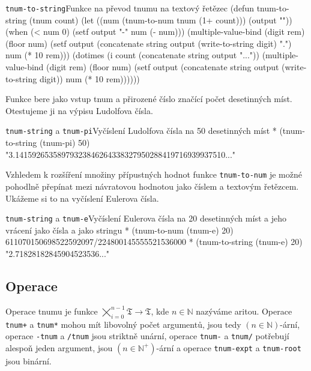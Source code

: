 \begin{lispcode}{\texttt{tnum-to-string}}{Funkce na převod tnumu na textový řetězec}
(\textcolor{funkcionalni}{defun} \textcolor{pojmenovan}{tnum-to-string} (tnum count)
  (\textcolor{vedlejsi}{let} ((num (\textcolor{moje}{tnum-to-num} tnum (\textcolor{matematicke}{1+} count))) (output ""))
    (\textcolor{funkcionalni}{when} (\textcolor{matematicke}{<} num 0) (\textcolor{vedlejsi}{setf} output "-" num (\textcolor{matematicke}{-} num)))
    (\textcolor{matematicke}{multiple-value-bind} (digit rem)
        (\textcolor{matematicke}{floor} num)
      (\textcolor{vedlejsi}{setf} output (\textcolor{matematicke}{concatenate} \textquotesingle\textcolor{moje}{string} output 
                                (\textcolor{funkcionalni}{write-to-string} digit) ".")
            num (\textcolor{matematicke}{*} 10 rem)))
    (\textcolor{funkcionalni}{dotimes} (i count (\textcolor{matematicke}{concatenate} \textquotesingle\textcolor{moje}{string} output "..."))
      (\textcolor{matematicke}{multiple-value-bind} (digit rem)
          (\textcolor{matematicke}{floor} num)
        (\textcolor{vedlejsi}{setf} output (\textcolor{matematicke}{concatenate} \textquotesingle\textcolor{moje}{string} output 
                                  (\textcolor{funkcionalni}{write-to-string} digit))
              num (\textcolor{matematicke}{*} 10 rem))))))
\end{lispcode}
Funkce bere jako vstup tnum a přirozené číslo značící počet desetinných míst. Otestujeme ji na výpisu Ludolfova čísla.

\begin{lisptest}{\texttt{tnum-string} a \texttt{tnum-pi}}{Vyčíslení Ludolfova čísla na 50 desetinných míst}
* (tnum-to-string (tnum-pi) 50)
"3.14159265358979323846264338327950288419716939937510..."
\end{lisptest}

Vzhledem k rozšíření množiny přípustných hodnot funkce \texttt{tnum-to-num} je možné pohodlně přepínat mezi návratovou hodnotou jako číslem a textovým řetězcem. Ukážeme si to na vyčíslení Eulerova čísla.

\begin{lisptest}{\texttt{tnum-string} a \texttt{tnum-e}}{Vyčíslení Eulerova čísla na 20 desetinných míst a jeho vrácení jako čísla a jako stringu}
* (tnum-to-num (tnum-e) 20)
611070150698522592097/224800145555521536000
* (tnum-to-string (tnum-e) 20)
"2.71828182845904523536..."
\end{lisptest}

\subsection{Operace}
Operace tnumu je funkce $\bigtimes_{i=0}^{n-1}\mathfrak{T}\rightarrow\mathfrak{T}$, kde $n\in\mathbb{N}$ nazýváme aritou. Operace \texttt{tnum+} a \texttt{tnum*} mohou mít libovolný počet argumentů, jsou tedy $(n \in \mathbb{N})$-ární, operace \texttt{-tnum} a \texttt{/tnum} jsou striktně unární, operace \texttt{tnum-} a \texttt{tnum/} potřebují alespoň jeden argument, jsou $(n \in \mathbb{N}^+)$-ární a operace \texttt{tnum-expt} a \texttt{tnum-root} jsou binární.

